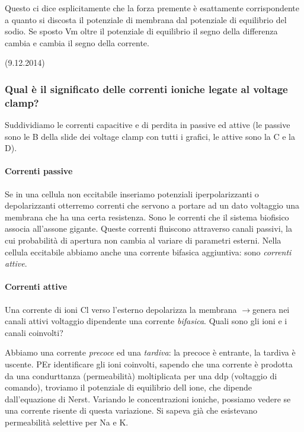 \documentclass[a4paper,12pt]{article}
\newcommand{\lfreccia}{\ensuremath{\longrightarrow}}
\begin{document}
Questo ci dice esplicitamente che la forza premente è esattamente corrispondente a quanto si discosta il potenziale di membrana dal potenziale di equilibrio del sodio.
Se sposto Vm oltre il potenziale di equilibrio il segno della differenza cambia e cambia il segno della corrente.


(9.12.2014)

\subsubsection{Qual è il significato delle correnti ioniche legate al voltage clamp?}

Suddividiamo le correnti capacitive e di perdita in passive ed attive (le passive sono le B della slide dei voltage clamp con tutti i grafici, le attive sono la C e la D).

\paragraph{Correnti passive}

Se in una cellula non eccitabile inseriamo potenziali iperpolarizzanti o depolarizzanti otterremo correnti che servono a portare ad un dato voltaggio una membrana che ha una certa resistenza. Sono le correnti che il sistema biofisico associa all'assone gigante. Queste correnti fluiscono attraverso canali passivi, la cui probabilità di apertura non cambia al variare di parametri esterni. Nella cellula eccitabile abbiamo anche una corrente bifasica aggiuntiva: sono \emph{correnti attive}.

\paragraph{Correnti attive}
Una corrente di ioni Cl verso l'esterno depolarizza la membrana \lfreccia genera nei canali attivi voltaggio dipendente una corrente \emph{bifasica}. Quali sono gli ioni e i canali coinvolti?

Abbiamo una corrente \emph{precoce} ed una \emph{tardiva}: la precoce è entrante, la tardiva  è uscente. PEr identificare gli ioni coinvolti, sapendo che una corrente è prodotta da una condurttanza (permeabilità) moltiplicata per una ddp (voltaggio di comando), troviamo il potenziale di equilibrio dell ione, che dipende dall'equazione di Nerst. Variando le concentrazioni ioniche, possiamo vedere se una corrente risente di questa variazione. Si sapeva già che esistevano permeabilità selettive per Na e K.
\end{document}

